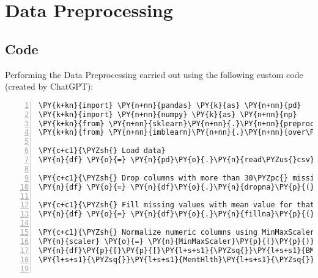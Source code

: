 \documentclass[12pt]{article}
\begin{document}
\section{Data Preprocessing} \subsection{Code}Performing the Data Preprocessing carried out using the following custom code (created by ChatGPT):

\begin{Verbatim}[commandchars=\\\{\},numbers=left,firstnumber=1,stepnumber=1,formatcom=\footnotesize]
\PY{k+kn}{import} \PY{n+nn}{pandas} \PY{k}{as} \PY{n+nn}{pd}
\PY{k+kn}{import} \PY{n+nn}{numpy} \PY{k}{as} \PY{n+nn}{np}
\PY{k+kn}{from} \PY{n+nn}{sklearn}\PY{n+nn}{.}\PY{n+nn}{preprocessing} \PY{k+kn}{import} \PY{n}{MinMaxScaler}
\PY{k+kn}{from} \PY{n+nn}{imblearn}\PY{n+nn}{.}\PY{n+nn}{over\PYZus{}sampling} \PY{k+kn}{import} \PY{n}{RandomOverSampler}

\PY{c+c1}{\PYZsh{} Load data}
\PY{n}{df} \PY{o}{=} \PY{n}{pd}\PY{o}{.}\PY{n}{read\PYZus{}csv}\PY{p}{(}\PY{l+s+s1}{\PYZsq{}}\PY{l+s+s1}{diabetes\PYZus{}binary\PYZus{}health\PYZus{}indicators\PYZus{}BRFSS2015.csv}\PY{l+s+s1}{\PYZsq{}}\PY{p}{)}

\PY{c+c1}{\PYZsh{} Drop columns with more than 30\PYZpc{} missing values}
\PY{n}{df} \PY{o}{=} \PY{n}{df}\PY{o}{.}\PY{n}{dropna}\PY{p}{(}\PY{n}{thresh}\PY{o}{=}\PY{n+nb}{int}\PY{p}{(}\PY{l+m+mf}{0.7}\PY{o}{*}\PY{n+nb}{len}\PY{p}{(}\PY{n}{df}\PY{p}{)}\PY{p}{)}\PY{p}{,} \PY{n}{axis}\PY{o}{=}\PY{l+m+mi}{1}\PY{p}{)}

\PY{c+c1}{\PYZsh{} Fill missing values with mean value for that column}
\PY{n}{df} \PY{o}{=} \PY{n}{df}\PY{o}{.}\PY{n}{fillna}\PY{p}{(}\PY{n}{df}\PY{o}{.}\PY{n}{mean}\PY{p}{(}\PY{p}{)}\PY{p}{)}

\PY{c+c1}{\PYZsh{} Normalize numeric columns using MinMaxScaler}
\PY{n}{scaler} \PY{o}{=} \PY{n}{MinMaxScaler}\PY{p}{(}\PY{p}{)}
\PY{n}{df}\PY{p}{[}\PY{p}{[}\PY{l+s+s1}{\PYZsq{}}\PY{l+s+s1}{BMI}\PY{l+s+s1}{\PYZsq{}}\PY{p}{,} \PY{l+s+s1}{\PYZsq{}}\PY{l+s+s1}{MentHlth}\PY{l+s+s1}{\PYZsq{}}\PY{p}{,} \PY{l+s+s1}{\PYZsq{}}\PY{l+s+s1}{PhysHlth}\PY{l+s+s1}{\PYZsq{}}\PY{p}{]}\PY{p}{]} \PY{o}{=} \PY{n}{scaler}\PY{o}{.}\PY{n}{fit\PYZus{}transform}\PY{p}{(}\PY{n}{df}\PY{p}{[}\PY{p}{[}\PY{l+s+s1}{\PYZsq{}}\PY{l+s+s1}{BMI}\PY{l+s+s1}{\PYZsq{}}\PY{p}{,} \PYZbs{}
\PY{l+s+s1}{\PYZsq{}}\PY{l+s+s1}{MentHlth}\PY{l+s+s1}{\PYZsq{}}\PY{p}{,} \PY{l+s+s1}{\PYZsq{}}\PY{l+s+s1}{PhysHlth}\PY{l+s+s1}{\PYZsq{}}\PY{p}{]}\PY{p}{]}\PY{p}{)}


\end{Verbatim}
\end{document}
